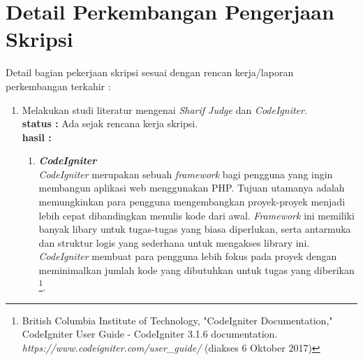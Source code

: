 \documentclass[a4paper,twoside]{article}
\begin{document}
\section{Detail Perkembangan Pengerjaan Skripsi}
Detail bagian pekerjaan skripsi sesuai dengan rencan kerja/laporan perkembangan terkahir :
	\begin{enumerate}
		\item Melakukan studi literatur mengenai \textit{Sharif Judge} dan \textit{CodeIgniter}.\\
		{\bf status :} Ada sejak rencana kerja skripsi.\\
		{\bf hasil :} 
		\begin{enumerate}
			\item \textbf{\textit{CodeIgniter} }\\
			\textit{CodeIgniter} merupakan sebuah \textit{framework} bagi pengguna yang ingin membangun aplikasi web menggunakan PHP. Tujuan utamanya adalah memungkinkan para pengguna mengembangkan proyek-proyek menjadi lebih cepat dibandingkan menulis kode dari awal. \textit{Framework} ini memiliki banyak libary untuk tugas-tugas yang biasa diperlukan, serta antarmuka dan struktur logis yang sederhana untuk mengakses library ini. \textit{CodeIgniter} membuat para pengguna lebih fokus pada proyek dengan meminimalkan jumlah kode yang dibutuhkan untuk tugas yang diberikan \footnote{British Columbia Institute of Technology, "CodeIgniter Documentation," CodeIgniter User Guide - CodeIgniter 3.1.6 documentation. \textit{https://www.codeigniter.com/user\_guide/} (diakses 6 Oktober 2017)}. \\
			

\end{enumerate}
\end{enumerate}
\end{document}
